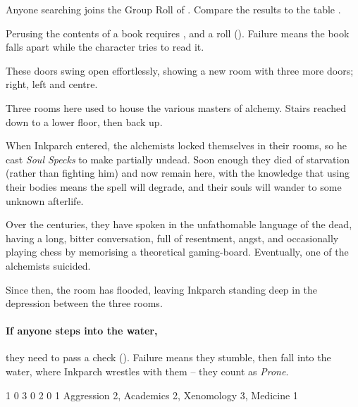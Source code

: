 
Anyone searching joins the Group Roll of .
Compare the results to the table .

Perusing the contents of a book requires , and a  roll (\tn[10]).
Failure means the book falls apart while the character tries to read it.

\begin{boxtext}
  These doors swing open effortlessly, showing a new room with three more doors; right, left and centre.
\end{boxtext}

\begin{exampletext}
  Three rooms here used to house the various masters of alchemy.
  Stairs reached down to a lower floor, then back up.

  When Inkparch entered, the alchemists locked themselves in their rooms, so he cast \textit{Soul Specks} to make partially undead.
  Soon enough they died of starvation (rather than fighting him) and now remain here, with the knowledge that using their bodies means the spell will degrade, and their souls will wander to some unknown afterlife.

  Over the centuries, they have spoken in the unfathomable language of the dead, having a long, bitter conversation, full of resentment, angst, and occasionally playing chess by memorising a theoretical gaming-board.
  Eventually, one of the alchemists suicided.

  Since then, the room has flooded, leaving Inkparch standing deep in the depression between the three rooms.
\end{exampletext}

\paragraph{If anyone steps into the water,}
they need to pass a  check (\tn[10]).
Failure means they stumble, then fall into the water, where Inkparch wrestles with them -- they count as \textit{Prone}.%

\setcounter{wounds}{4}

  {1}%
  {0}%
  {{3}%
  {0}%
  {2}}%
  {0}%
  {1}%
  {
    Aggression 2, Academics 2, Xenomology 3, Medicine 1
  }%
  {\longsword}%
  {
    \addtocounter{xpbonus}{3}
    \setcounter{Brawl}{2}
    \setcounter{Academics}{3}
    \setcounter{Xenomology}{2}
    \setcounter{Medicine}{1}
    \setcounter{Stealth}{1}
    \setcounter{Air}{3}
    \setcounter{Earth}{2}
    \setcounter{Fire}{2}
    \undead
  }

